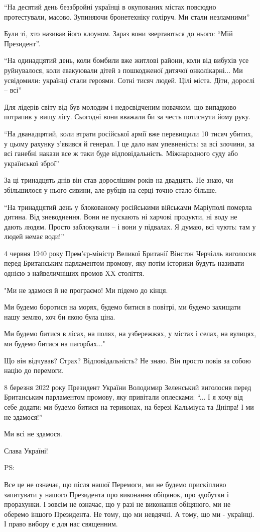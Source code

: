 \enquote{На десятий день беззбройні українці в окупованих містах повсюдно протестували,
масово. Зупиняючи бронетехніку голіруч. Ми стали незламними}

Були ті, хто називав його клоуном. Зараз вони звертаються до нього: \enquote{Мій
Президент}.

\enquote{На одинадцятий день, коли бомбили вже житлові райони, коли від вибухів усе
руйнувалося, коли евакуювали дітей з пошкодженої дитячої онколікарні... Ми
усвідомили: українці стали героями. Сотні тисяч людей. Цілі міста. Діти,
дорослі – всі}

Для лідерів світу від був молодим і недосвідченим новачком, що випадково
потрапив у вищу лігу. Сьогодні вони вважали би за честь потиснути йому руку.

\enquote{На дванадцятий, коли втрати російської армії вже перевищили 10 тисяч убитих, у
цьому рахунку з'явився й генерал. І це дало нам упевненість: за всі злочини, за
всі ганебні накази все ж таки буде відповідальність. Міжнародного суду або
української зброї}

За ці тринадцять днів він став дорослішим років на двадцять. Не знаю, чи
збільшилося у нього сивини, але рубців на серці точно стало більше.

\enquote{На тринадцятий день у блокованому російськими військами Маріуполі померла
дитина. Від зневоднення. Вони не пускають ні харчові продукти, ні воду не дають
людям. Просто заблокували – і вони у підвалах. Я думаю, всі чують: там у людей
немає води!}

4 червня 1940 року Прем'єр-міністр Великої Британії Вінстон Черчілль виголосив
перед Британським парламентом промову, яку потім історики будуть називати
однією з найвеличніших промов XX століття. 

\begin{zzquote}
"Ми не здамося й не програємо! Ми підемо до кінця.

Ми будемо боротися на морях, будемо битися в повітрі, ми будемо захищати нашу
землю, хоч би якою була ціна.

Ми будемо битися в лісах, на полях, на узбережжях, у містах і селах, на
вулицях, ми будемо битися на пагорбах..."
\end{zzquote}

Що він відчував? Страх? Відповідальність? Не знаю. Він просто повів за собою
націю до перемоги.

8 березня 2022 року Президент України Володимир Зеленський  виголосив перед
Британським парламентом промову, яку привітали оплесками: \enquote{... І я хочу від
себе додати: ми будемо битися на териконах, на березі Кальміуса та Дніпра! І ми
не здамося!}

Ми всі не здамося.

Слава Україні!

PS:

Все це не означає, що після нашої Перемоги, ми не будемо прискіпливо запитувати
у нашого Президента про виконання обіцянок, про здобутки і прорахунки. І зовсім
не означає, що у разі не виконання обіцяного, ми не оберемо іншого Президента.
Не тому, що ми невдячні. А тому, що ми - українці. І право вибору є для нас
священним.
